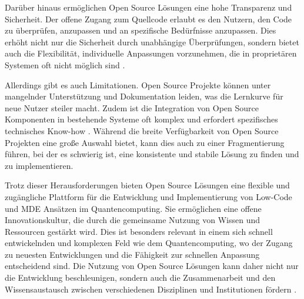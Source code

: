 Darüber hinaus ermöglichen Open Source Lösungen eine hohe Transparenz und Sicherheit. Der offene Zugang 
zum Quellcode erlaubt es den Nutzern, den Code zu überprüfen, anzupassen und an spezifische Bedürfnisse 
anzupassen. Dies erhöht nicht nur die Sicherheit durch unabhängige Überprüfungen, sondern bietet auch 
die Flexibilität, individuelle Anpassungen vorzunehmen, die in proprietären Systemen oft nicht 
möglich sind \cite{von2006promise}.

Allerdings gibt es auch Limitationen. Open Source Projekte können unter mangelnder Unterstützung und 
Dokumentation leiden, was die Lernkurve für neue Nutzer steiler macht. Zudem ist die Integration von 
Open Source Komponenten in bestehende Systeme oft komplex und erfordert spezifisches technisches 
Know-how \cite{chesbrough2006open}. Während die breite Verfügbarkeit von Open Source Projekten eine große 
Auswahl bietet, kann dies auch zu einer Fragmentierung führen, bei der es schwierig ist, eine konsistente 
und stabile Lösung zu finden und zu implementieren.

Trotz dieser Herausforderungen bieten Open Source Lösungen eine flexible und zugängliche Plattform für 
die Entwicklung und Implementierung von Low-Code und MDE Ansätzen im Quantencomputing. Sie ermöglichen 
eine offene Innovationskultur, die durch die gemeinsame Nutzung von Wissen und Ressourcen gestärkt 
wird. Dies ist besonders relevant in einem sich schnell entwickelnden und komplexen Feld wie dem 
Quantencomputing, wo der Zugang zu neuesten Entwicklungen und die Fähigkeit zur schnellen Anpassung 
entscheidend sind. Die Nutzung von Open Source Lösungen kann daher nicht nur die Entwicklung 
beschleunigen, sondern auch die Zusammenarbeit und den Wissensaustausch zwischen verschiedenen 
Disziplinen und Institutionen fördern \cite{west2006challenges}.

